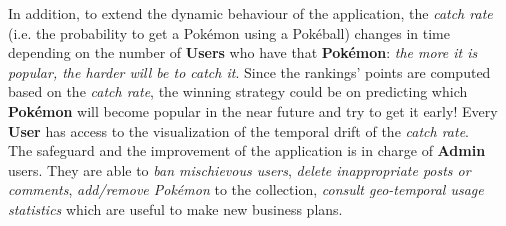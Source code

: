 In addition, to extend the dynamic behaviour of the application, the \textit{catch rate} (i.e. the probability to get a Pokémon using a Pokéball) changes in time depending on the number of \textbf{Users} who have that \textbf{Pokémon}: \textit{the more it is popular, the harder will be to catch it}. Since the rankings’ points are computed based on the \textit{catch rate}, the winning strategy could be on predicting which \textbf{Pokémon} will become popular in the near future and try to get it early! Every \textbf{User} has access to the visualization of the temporal drift of the \textit{catch rate}. \medskip \\
The safeguard and the improvement of the application is in charge of \textbf{Admin} users. They are able to \textit{ban mischievous users}, \textit{delete inappropriate posts or comments}, \textit{add/remove Pokémon} to the collection, \textit{consult geo-temporal usage statistics} which are useful to make new business plans. \medskip \\
